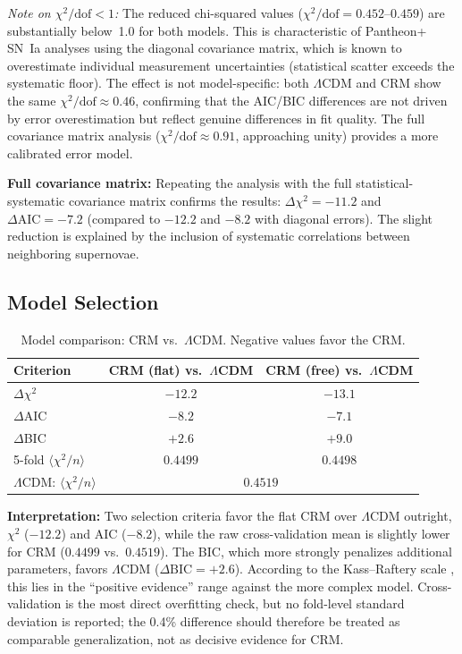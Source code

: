 \documentclass[aps,prd,twocolumn,superscriptaddress,nofootinbib]{revtex4-2}
\begin{document}
\textit{Note on $\chi^2/\mathrm{dof} < 1$:} The reduced chi-squared values ($\chi^2/\mathrm{dof} = 0.452$--$0.459$) are substantially below~1.0 for both models. This is characteristic of Pantheon+ SN~Ia analyses using the diagonal covariance matrix, which is known to overestimate individual measurement uncertainties (statistical scatter exceeds the systematic floor). The effect is not model-specific: both $\Lambda$CDM and CRM show the same $\chi^2/\mathrm{dof} \approx 0.46$, confirming that the AIC/BIC differences are not driven by error overestimation but reflect genuine differences in fit quality. The full covariance matrix analysis ($\chi^2/\mathrm{dof} \approx 0.91$, approaching unity) provides a more calibrated error model.

\textbf{Full covariance matrix:} Repeating the analysis with the full statistical-systematic covariance matrix confirms the results: $\Delta\chi^2 = -11.2$ and $\Delta\mathrm{AIC} = -7.2$ (compared to $-12.2$ and $-8.2$ with diagonal errors). The slight reduction is explained by the inclusion of systematic correlations between neighboring supernovae.

\subsection{Model Selection}
\label{subsec:modelselection}

\begin{table}[htbp]
\centering
\caption{Model comparison: CRM vs.\ $\Lambda$CDM. Negative values favor the CRM.}
\label{tab:comparison}
\begin{tabular}{lcc}
\toprule
\textbf{Criterion} & CRM (flat) vs.\ $\Lambda$CDM & CRM (free) vs.\ $\Lambda$CDM \\
\midrule
$\Delta\chi^2$ & $\mathbf{-12.2}$ & $-13.1$ \\
$\Delta$AIC & $\mathbf{-8.2}$ & $-7.1$ \\
$\Delta$BIC & $+2.6$ & $+9.0$ \\
\midrule
5-fold $\langle\chi^2/n\rangle$ & $\mathbf{0.4499}$ & $0.4498$ \\
$\Lambda$CDM: $\langle\chi^2/n\rangle$ & \multicolumn{2}{c}{$0.4519$} \\
\bottomrule
\end{tabular}
\end{table}

\textbf{Interpretation:} Two selection criteria favor the flat CRM over $\Lambda$CDM outright, $\chi^2$ ($-12.2$) and AIC ($-8.2$), while the raw cross-validation mean is slightly lower for CRM ($0.4499$ vs.\ $0.4519$). The BIC, which more strongly penalizes additional parameters, favors $\Lambda$CDM ($\Delta\mathrm{BIC} = +2.6$). According to the Kass--Raftery scale \cite{KassRaftery1995}, this lies in the ``positive evidence'' range against the more complex model. Cross-validation is the most direct overfitting check, but no fold-level standard deviation is reported; the 0.4\% difference should therefore be treated as comparable generalization, not as decisive evidence for CRM.
\end{document}
